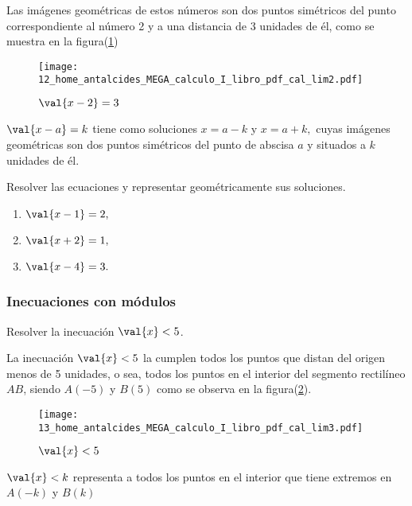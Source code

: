 Las imágenes geométricas de estos números son dos puntos simétricos
del punto correspondiente al número 2 y a una distancia de 3 unidades
de él, como se muestra en la figura(\ref{fig:cal_lim2}) 

\begin{figure}[H]
\centering\texttt{[image: 12\_home\_antalcides\_MEGA\_calculo\_I\_libro\_pdf\_cal\_lim2.pdf]}\caption{$\val{x-2}=3$}\label{fig:cal_lim2}
\end{figure}
\fin

\general $\val{x-a}=k$ tiene como soluciones $x=a-k$ y $x=a+k,$
cuyas imágenes geométricas son dos puntos simétricos del punto de
abscisa $a$ y situados a $k$ unidades de él.\vspace*{10pt}

\begin{ejercicios}[]

Resolver las ecuaciones y representar geométricamente sus soluciones.
\begin{enumerate}
\item $\val{x-1}=2,$
\item $\val{x+2}=1,$
\item $\val{x-4}=3.$
\end{enumerate}
\end{ejercicios}

\subsubsection{Inecuaciones con módulos\label{subsec:Inecuaciones-con-m=0000F3dulos}}

\begin{ejemplo}

Resolver la inecuación $\val{x}<5$. 

\end{ejemplo}

\sol La inecuación $\val{x}<5$ la cumplen todos los puntos que distan
del origen menos de 5 unidades, o sea, todos los puntos en el interior
del segmento rectilíneo $AB$, siendo $A\left(-5\right)$ y $B\left(5\right)$
como se observa en la figura(\ref{fig:cal_lim3}). 

\begin{figure}[H]
\centering\texttt{[image: 13\_home\_antalcides\_MEGA\_calculo\_I\_libro\_pdf\_cal\_lim3.pdf]}\caption{$\val{x}<5$}\label{fig:cal_lim3}
\end{figure}
\fin

\general $\val{x}<k$ representa a todos los puntos en el interior
que tiene extremos en $A\left(-k\right)$ y $B\left(k\right)$ 

